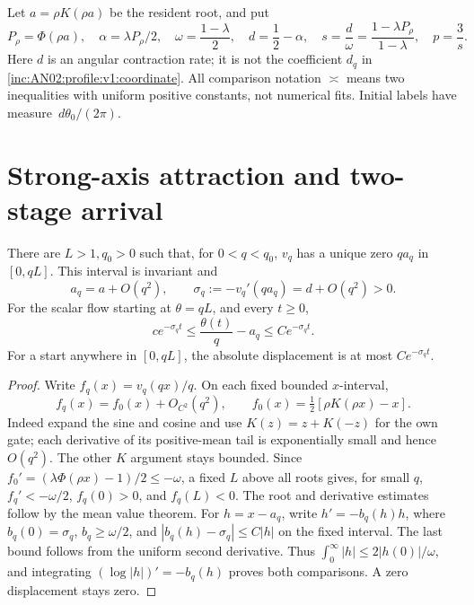 \documentclass[11pt]{article}
\numberwithin{equation}{section}
\theoremstyle{remark}\newtheorem{remark}[theorem]{Remark}
\newcommand{\dd}{\,d}\newcommand{\E}{\mathbb E}\newcommand{\R}{\mathbb R}
\begin{document}
Let $a=\rho K(\rho a)$ be the resident root, and put
\begin{equation}\label{inc:AN02:profile:v1:powers}
 P_\rho=\Phi(\rho a),\quad \alpha=\lambda P_\rho/2,\quad
 \omega=\frac{1-\lambda}{2},\quad d=\frac12-\alpha,\quad s=\frac d\omega=\frac{1-\lambda P_\rho}{1-\lambda},\quad p=\frac3s.
\end{equation}
Here $d$ is an angular contraction rate; it is not the coefficient $d_q$ in \eqref{inc:AN02:profile:v1:coordinate}.
All comparison notation $\asymp$ means two inequalities with uniform positive constants, not numerical fits. Initial labels have measure $\dd\theta_0/(2\pi)$.

\section{Strong-axis attraction and two-stage arrival}
\begin{lemma}\label{inc:AN02:profile:v1:root}
There are $L>1,q_0>0$ such that, for $0<q<q_0$, $v_q$ has a unique zero $qa_q$ in $[0,qL]$. This interval is invariant and
\[
 a_q=a+O(q^2),\qquad \sigma_q:=-v_q'(qa_q)=d+O(q^2)>0.
\]
For the scalar flow starting at $\theta=qL$, and every $t\ge0$,
\begin{equation}\label{inc:AN02:profile:v1:localdecay}
 c e^{-\sigma_q t}\le \frac{\theta(t)}q-a_q\le C e^{-\sigma_q t}.
\end{equation}
For a start anywhere in $[0,qL]$, the absolute displacement is at most $C e^{-\sigma_q t}$.
\end{lemma}
\begin{proof}
Write $f_q(x)=v_q(qx)/q$. On each fixed bounded $x$-interval,
\[
 f_q(x)=f_0(x)+O_{C^2}(q^2),\qquad f_0(x)=\tfrac12[\rho K(\rho x)-x].
\]
Indeed expand the sine and cosine and use $K(z)=z+K(-z)$ for the own gate; each derivative of its positive-mean tail is exponentially small and hence $O(q^2)$. The other $K$ argument stays bounded. Since $f_0'=(\lambda\Phi(\rho x)-1)/2\le-\omega$, a fixed $L$ above all roots gives, for small $q$, $f_q'<-\omega/2$, $f_q(0)>0$, and $f_q(L)<0$. The root and derivative estimates follow by the mean value theorem.
For $h=x-a_q$, write $h'=-b_q(h)h$, where $b_q(0)=\sigma_q$, $b_q\ge\omega/2$, and $|b_q(h)-\sigma_q|\le C|h|$ on the fixed interval. The last bound follows from the uniform second derivative. Thus $\int_0^\infty |h|\le2|h(0)|/\omega$, and integrating $(\log|h|)'=-b_q(h)$ proves both comparisons. A zero displacement stays zero.
\end{proof}
\end{document}
